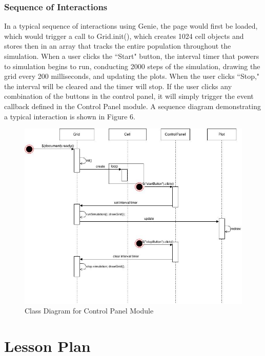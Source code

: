 \documentclass[12pt]{article}
\begin{document}
\begin{spacing}{1.5}
\subsubsection{Sequence of Interactions}
In a typical sequence of interactions using Genie, the page would first be loaded, which would trigger a call to Grid.init(), which creates 1024 cell objects and stores then in an array that tracks the entire population throughout the simulation. When a user clicks the ``Start" button, the interval timer that powers to simulation begins to run, conducting 2000 steps of the simulation, drawing the grid every 200 milliseconds, and updating the plots. When the user clicks ``Stop," the interval will be cleared and the timer will stop. If the user clicks any combination of the buttons in the control panel, it will simply trigger the event callback defined in the Control Panel module. A sequence diagram demonstrating a typical interaction is shown in Figure 6.
\begin{figure}[h]
\caption{Class Diagram for Control Panel Module}
\centering
\includegraphics[scale=0.5]{sequence-diagram}
\end{figure}

\section{Lesson Plan}


\end{spacing}
\end{document}
